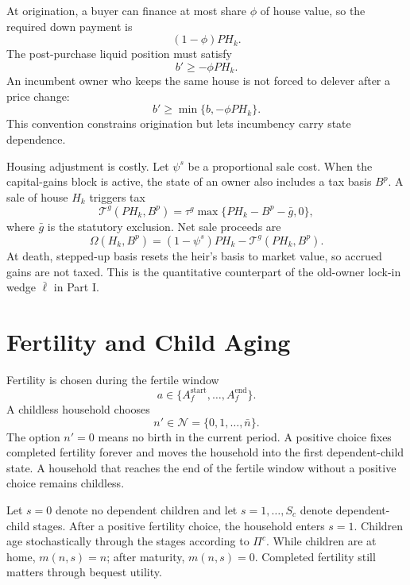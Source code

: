 \documentclass[11pt]{article}
\newcommand{\1}{\mathbf 1}
\newcommand{\Nset}{\mathcal N}
\newcommand{\Tcal}{\mathcal T}
\begin{document}
At origination, a buyer can finance at most share $\phi$ of house value, so the
required down payment is
\begin{equation}
    (1-\phi)PH_k.
\label{eq:quant_dp}
\end{equation}
The post-purchase liquid position must satisfy
\begin{equation}
b'\ge -\phi P H_k.
\label{eq:quant_ltv}
\end{equation}
An incumbent owner who keeps the same house is not forced to delever after a
price change:
\begin{equation}
b'\ge \min\{b,-\phi P H_k\}.
\label{eq:quant_incumbent_ltv}
\end{equation}
This convention constrains origination but lets incumbency carry state
dependence.

Housing adjustment is costly. Let $\psi^s$ be a proportional sale cost. When
the capital-gains block is active, the state of an owner also includes a tax
basis $B^p$. A sale of house $H_k$ triggers tax
\begin{equation}
\Tcal^g(PH_k,B^p)
=
\tau^g\max\{PH_k-B^p-\bar g,0\},
\label{eq:quant_capital_gains_tax}
\end{equation}
where $\bar g$ is the statutory exclusion. Net sale proceeds are
\begin{equation}
\Omega(H_k,B^p)
=(1-\psi^s)PH_k-\Tcal^g(PH_k,B^p).
\label{eq:quant_sale_proceeds}
\end{equation}
At death, stepped-up basis resets the heir's basis to market value, so accrued
gains are not taxed. This is the quantitative counterpart of the old-owner
lock-in wedge $\bar\ell$ in Part I.

\section{Fertility and Child Aging}

Fertility is chosen during the fertile window
\[
a\in\{A_f^{\mathrm{start}},\ldots,A_f^{\mathrm{end}}\}.
\]
A childless household chooses
\begin{equation}
n'\in\Nset=\{0,1,\ldots,\bar n\}.
\label{eq:quant_fertility_set}
\end{equation}
The option $n'=0$ means no birth in the current period. A positive choice fixes
completed fertility forever and moves the household into the first
dependent-child state. A household that reaches the end of the fertile window
without a positive choice remains childless.

Let $s=0$ denote no dependent children and let $s=1,\ldots,S_c$ denote
dependent-child stages. After a positive fertility choice, the household enters
$s=1$. Children age stochastically through the stages according to $\Pi^c$.
While children are at home, $m(n,s)=n$; after maturity, $m(n,s)=0$. Completed
fertility still matters through bequest utility.
\end{document}
